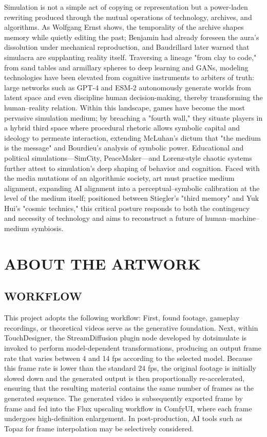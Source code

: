 \documentclass[sigconf,authordraft]{acmart}
\begin{document}
Simulation is not a simple act of copying or representation but a power-laden rewriting produced through the mutual operations of technology, archives, and algorithms. As Wolfgang Ernst shows, the temporality of the archive shapes memory while quietly editing the past; Benjamin had already foreseen the aura's dissolution under mechanical reproduction, and Baudrillard later warned that simulacra are supplanting reality itself. Traversing a lineage "from clay to code," from sand tables and armillary spheres to deep learning and GANs, modeling technologies have been elevated from cognitive instruments to arbiters of truth: large networks such as GPT-4 and ESM-2 autonomously generate worlds from latent space and even discipline human decision-making, thereby transforming the human–reality relation. Within this landscape, games have become the most pervasive simulation medium; by breaching a "fourth wall," they situate players in a hybrid third space where procedural rhetoric allows symbolic capital and ideology to permeate interaction, extending McLuhan's dictum that "the medium is the message" and Bourdieu's analysis of symbolic power. Educational and political simulations—SimCity, PeaceMaker—and Lorenz-style chaotic systems further attest to simulation's deep shaping of behavior and cognition. Faced with the media mutations of an algorithmic society, art must practice medium alignment, expanding AI alignment into a perceptual–symbolic calibration at the level of the medium itself; positioned between Stiegler's "third memory" and Yuk Hui's "cosmic technics," this critical posture responds to both the contingency and necessity of technology and aims to reconstruct a future of human–machine–medium symbiosis.
\section{ABOUT THE ARTWORK}




\subsection{WORKFLOW}
This project adopts the following workflow: First, found footage, gameplay recordings, or theoretical videos serve as the generative foundation. Next, within TouchDesigner, the StreamDiffusion plugin node developed by dotsimulate is invoked to perform model-dependent transformations, producing an output frame rate that varies between 4 and 14 fps according to the selected model. Because this frame rate is lower than the standard 24 fps, the original footage is initially slowed down and the generated output is then proportionally re-accelerated, ensuring that the resulting material contains the same number of frames as the generated sequence. The generated video is subsequently exported frame by frame and fed into the Flux upscaling workflow in ComfyUI, where each frame undergoes high-definition enlargement. In post-production, AI tools such as Topaz for frame interpolation may be selectively considered.
\end{document}
